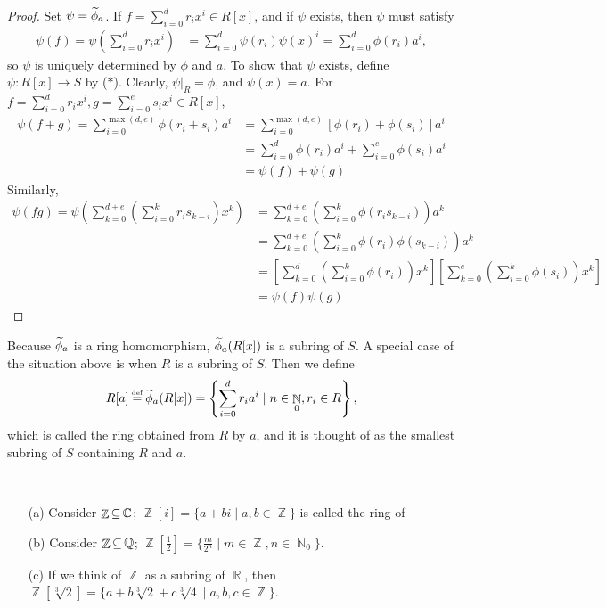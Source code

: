\documentclass[11pt]{book}
\theoremstyle{definition}   \newtheorem{defn}[counter]{Definition} %
\newcommand\myeq{\mathrel{\overset{\makebox[0pt]{\mbox{\normalfont\tiny\sffamily \textrm{def}}}}{=}}}
\DeclareMathOperator{\R}{\mathbb{R}}   \DeclareMathOperator{\N}{\mathbb{N}}   \DeclareMathOperator{\z}{\mathbb{Z}}   \DeclareMathOperator{\Q}{\mathbb{Q}}
\DeclareMathOperator{\ra}{\rightarrow}   \DeclareMathOperator{\Poly}{\mathbf{P}}   \DeclareMathOperator{\spn}{\textnormal{span}}   \DeclareMathOperator{\aut}{\textnormal{Aut}}
\newcommand{\vs}{\vspace{8pt}}
\numberwithin{counter}{chapter}
\begin{document}
\begin{proof}
Set $\psi = \widetilde{\phi}_a$. If $f = \sum_{i=0}^d r_i x^i \in R[x]$, and if $\psi$ exists, then $\psi$ must satisfy
\begin{align*}
\psi(f) = \psi\left( \sum_{i=0}^d r_i x^i \right) &= \sum_{i=0}^d \psi(r_i) \psi(x)^i = \sum_{i=0}^d \phi(r_i)a^i, \tag{$\ast$}
\end{align*}
so $\psi$ is uniquely determined by $\phi$ and $a$. To show that $\psi$ exists, define $\psi : R[x] \ra S$ by ($\ast$). Clearly, $\psi|_R = \phi$, and $\psi(x) = a$. For $f = \sum_{i=0}^d r_i x^i, g = \sum_{i=0}^e s_ix^i \in R[x]$,
\begin{align*}
\psi(f+g) = \sum_{i=0}^{\max(d,e)}\phi(r_i+s_i)a^i &= \sum_{i=0}^{\max(d,e)} [\phi(r_i)+\phi(s_i)]a^i \\
&= \sum_{i=0}^d \phi(r_i) a^i + \sum_{i=0}^e \phi(s_i)a^i \\
&= \psi(f) + \psi(g)
\end{align*}
Similarly,
\begin{align*}
\psi(fg) = \psi \left(\sum_{k=0}^{d+e} \left(\sum_{i=0}^k r_is_{k-i}\right)x^k\right) &= \sum_{k=0}^{d+e}\left(\sum_{i=0}^k \phi(r_is_{k-i})\right)a^k \\
&= \sum_{k=0}^{d+e} \left(\sum_{i=0}^k \phi(r_i)\phi(s_{k-i})\right)a^k \\
&= \left[\sum_{k=0}^d \left(\sum_{i=0}^k \phi(r_i)\right)x^k\right] \left[\sum_{k=0}^e \left(\sum_{i=0}^k \phi(s_i)\right)x^k\right] \\
&= \psi(f) \psi(g)
\end{align*}
\end{proof}

\vs

\begin{remark*}[\& Definition]
Because $\widetilde{\phi}_a$ is a ring homomorphism, $\widetilde{\phi}_a(R[x])$ is a subring of $S$. A special case of the situation above is when $R$ is a subring of $S$. Then we define
	\[R[a] \myeq \wt{\phi}_a(R[x]) = \left\{\sum_{i=0}^d r_i a^i \mid n \in \N_0, r_i \in R\right\}, \]
which is called the ring obtained from $R$ by  $a$, and it is thought of as the smallest subring of $S$ containing $R$ and $a$.
\begin{example*}
\
\begin{enumerate}
\item[(a)] Consider $\z \sub \C$; $\z[i] = \{a+bi \mid a,b \in \z\}$ is called the ring of 
\item[(b)] Consider $\z \sub \Q$; $\z\left[\frac{1}{2}\right] = \{\frac{m}{2^n} \mid m \in \z, n \in \N_0\}$.
\item[(c)] If we think of $\z$ as a subring of $\R$, then $\z[\sqrt[3]{2}] = \{a + b \sqrt[3]{2} + c \sqrt[3]{4} \mid a,b,c \in \z\}$.
\end{enumerate}
\end{example*}
\end{remark*}
\end{document}
